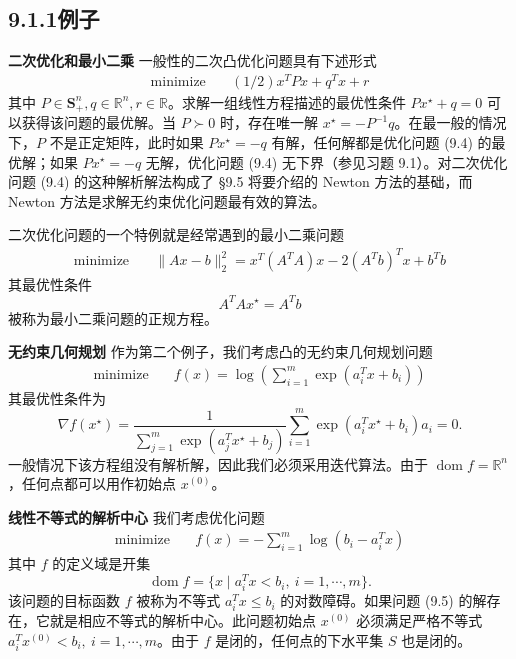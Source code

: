 \documentclass[UTF8,12pt,a4paper,fontset=fandol]{ctexart}
\begin{document}
\subsection*{9.1.1\quad 例子}

\noindent\textbf{二次优化和最小二乘}\quad
一般性的二次凸优化问题具有下述形式
\begin{equation}
\begin{aligned}
\text{minimize}\quad & (1/2)x^TPx+q^Tx+r
\end{aligned}
\tag{9.4}
\end{equation}
其中 $P\in\mathbf{S}_+^n,q\in\mathbb{R}^n,r\in\mathbb{R}$。求解一组线性方程描述的最优性条件 $Px^\star+q=0$ 可以获得该问题的最优解。当 $P\succ0$ 时，存在唯一解 $x^\star=-P^{-1}q$。在最一般的情况下，$P$ 不是正定矩阵，此时如果 $Px^\star=-q$ 有解，任何解都是优化问题 (9.4) 的最优解；如果 $Px^\star=-q$ 无解，优化问题 (9.4) 无下界（参见习题 9.1）。对二次优化问题 (9.4) 的这种解析解法构成了 \S9.5 将要介绍的 Newton 方法的基础，而 Newton 方法是求解无约束优化问题最有效的算法。

二次优化问题的一个特例就是经常遇到的最小二乘问题
\[
\begin{aligned}
\text{minimize}\quad & \|Ax-b\|_2^2=x^T(A^TA)x-2(A^Tb)^Tx+b^Tb
\end{aligned}
\]
其最优性条件
\[
A^TAx^\star=A^Tb
\]
被称为最小二乘问题的正规方程。

\noindent\textbf{无约束几何规划}\quad
作为第二个例子，我们考虑凸的无约束几何规划问题
\[
\begin{aligned}
\text{minimize}\quad & f(x)=\log\left(\sum_{i=1}^m \exp(a_i^Tx+b_i)\right)
\end{aligned}
\]
其最优性条件为
\[
\nabla f(x^\star)=
\frac{1}{\sum_{j=1}^m\exp(a_j^Tx^\star+b_j)}
\sum_{i=1}^m \exp(a_i^Tx^\star+b_i)a_i=0.
\]
一般情况下该方程组没有解析解，因此我们必须采用迭代算法。由于 $\operatorname{dom} f=\mathbb{R}^n$，任何点都可以用作初始点 $x^{(0)}$。

\noindent\textbf{线性不等式的解析中心}\quad
我们考虑优化问题
\begin{equation}
\begin{aligned}
\text{minimize}\quad & f(x)=-\sum_{i=1}^m\log(b_i-a_i^Tx)
\end{aligned}
\tag{9.5}
\end{equation}
其中 $f$ 的定义域是开集
\[
\operatorname{dom} f=\{x\mid a_i^Tx<b_i,\ i=1,\cdots,m\}.
\]
该问题的目标函数 $f$ 被称为不等式 $a_i^Tx\leq b_i$ 的对数障碍。如果问题 (9.5) 的解存在，它就是相应不等式的解析中心。此问题初始点 $x^{(0)}$ 必须满足严格不等式 $a_i^Tx^{(0)}<b_i,\ i=1,\cdots,m$。由于 $f$ 是闭的，任何点的下水平集 $S$ 也是闭的。
\end{document}
